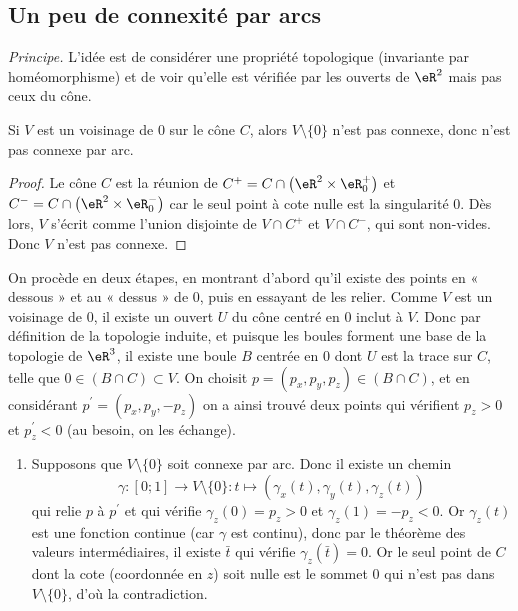 \subsection{Un peu de connexité par arcs}

\emph{Principe.} L'idée est de considérer une propriété topologique
(invariante par homéomorphisme) et de voir qu'elle est vérifiée par
les ouverts de $\eR^2$ mais pas ceux du cône.

\begin{lemma}Si $V$ est un voisinage de $0$ sur le cône $C$, alors
	$V\setminus\{0\}$ n'est pas connexe, donc n'est pas connexe par
	arc.\end{lemma}
\begin{proof}Le cône $C$ est la réunion de $C^+ = C \cap
		\left(\eR^2\times \eR_0^+\right)$ et $C^- = C \cap \left(\eR^2\times
		\eR_0^-\right)$ car le seul point à cote nulle est la singularité
	$0$. Dès lors, $V$ s'écrit comme l'union disjointe de $V\cap C^+$
	et $V\cap C^-$, qui sont non-vides. Donc $V$ n'est pas
	connexe.\end{proof}

On procède en deux étapes, en montrant d'abord qu'il
existe des points en « dessous » et au « dessus » de
$0$, puis en essayant de les relier.
Comme $V$ est un voisinage de $0$, il existe un ouvert $U$ du
cône centré en $0$ inclut à $V$. Donc par définition de la
topologie induite, et puisque les boules forment une base de la
topologie de $\eR^3$, il existe une boule $B$ centrée en $0$ dont
$U$ est la trace sur $C$, telle que $0 \in (B \cap C) \subset
	V$. On choisit $p = (p_x,p_y,p_z) \in (B \cap C)$, et en
considérant $p^\prime = (p_x, p_y, -p_z)$ on a ainsi trouvé deux
points qui vérifient $p_z > 0$ et $p^\prime_z < 0$ (au besoin,
on les échange).

\begin{enumerate}
	\item Supposons que $V\setminus\{0\}$ soit connexe par arc. Donc
	      il existe un chemin
	      \[\gamma : [0;1] \to V\setminus\{0\} : t \mapsto
		      (\gamma_x(t),\gamma_y(t),\gamma_z(t))\] qui relie $p$ à
	      $p^\prime$ et qui vérifie $\gamma_z(0) = p_z > 0$ et
	      $\gamma_z(1) = -p_z < 0$. Or $\gamma_z(t)$ est une fonction
	      continue (car $\gamma$ est continu), donc par le théorème des
	      valeurs intermédiaires, il existe $\bar t$ qui vérifie
	      $\gamma_z(\bar t) = 0$. Or le seul point de $C$ dont la cote
	      (coordonnée en $z$) soit nulle est le sommet $0$ qui n'est pas
	      dans $V\setminus\{0\}$, d'où la contradiction.
\end{enumerate}

